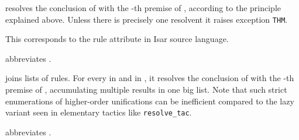 \begin{isabellebody}
\begin{isamarkuptext}
  \begin{description}

  \item {} resolves the conclusion of
   with the -th premise of ,
  according to the \hyperlink{inference.resolution}{\mbox{}} principle explained above.
  Unless there is precisely one resolvent it raises exception \verb|THM|.

  This corresponds to the rule attribute \hyperlink{attribute.THEN}{\mbox{}} in Isar
  source language.

  \item {} abbreviates .

  \item {} joins lists of rules.  For
  every  in  and  in
  , it resolves the conclusion of  with
  the -th premise of , accumulating multiple
  results in one big list.  Note that such strict enumerations of
  higher-order unifications can be inefficient compared to the lazy
  variant seen in elementary tactics like \verb|resolve_tac|.

  \item {} abbreviates .


\end{description}
\end{isamarkuptext}
\end{isabellebody}
